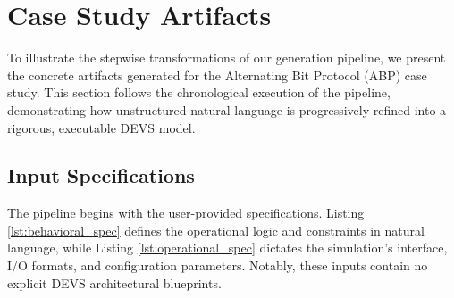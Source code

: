 \section{Case Study Artifacts}
\label{app:example_artifacts}

To illustrate the stepwise transformations of our generation pipeline, we present the concrete artifacts generated for the Alternating Bit Protocol (ABP) case study. This section follows the chronological execution of the pipeline, demonstrating how unstructured natural language is progressively refined into a rigorous, executable DEVS model. 



\subsection{Input Specifications}
\label{app:artifacts_input}
The pipeline begins with the user-provided specifications. Listing \ref{lst:behavioral_spec} defines the operational logic and constraints in natural language, while Listing \ref{lst:operational_spec} dictates the simulation's interface, I/O formats, and configuration parameters. Notably, these inputs contain no explicit DEVS architectural blueprints.

